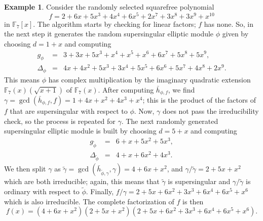 \documentclass[12pt]{article}
\theoremstyle{definition}
\newtheorem*{example*}{Example}
\def\F{\ensuremath{\mathbb{F}}}
\begin{document}
\begin{example*}
Consider the randomly selected squarefree polynomial 
\[ f = 2 + 6x + 5x^3 + 4x^4 + 6x^5 + 2x^7 + 3x^8 + 3x^9 + x^{10} \]
in $\F_7[x]$. The algorithm starts by checking for linear factors; $f$ has none. So, in the 
next step it generates the random supersingular elliptic module $\phi$ given by
choosing $d=1+x$ and computing
\[
\begin{array}{rll}
	g_\phi & = & 3 + 3x + 5x^3 + x^4 + x^5 + x^6 + 6x^7 + 5x^8 + 5x^9,\\
        \Delta_\phi&=&4x+4x^2+5x^3+3x^4+5x^5+6x^6+5x^7+4x^8+2x^9.
\end{array}
\]
This means $\phi$ has complex multiplication by the imaginary
quadratic extension $\F_7(x)(\sqrt{x + 1})$ of $\F_7(x)$. After
computing $\bar h_{\phi, f}$, we
find $\gamma = \gcd(\bar h_{\phi, f}, f) = 1 + 4x + x^2 + 4x^3 + x^4$; this is
the product of the factors of $f$ that are supersingular with respect
to $\phi$. Now, $\gamma$ does not pass the irreducibility check, so the
process is repeated for $\gamma$. The next randomly generated supersingular
elliptic module is built by choosing $d=5+x$ and computing
\[
\begin{array}{rll}
	g_{\tilde\phi} & = & 6 + x + 5x^2 + 5x^3,\\
	\Delta_{\tilde \phi} & = & 4+x + 6x^2 + 4x^3.
\end{array}
\]
We then split $\gamma$ as $ \tilde \gamma = \gcd(\bar h_{\tilde \phi,
  \gamma}, \gamma) = 4 + 6x + x^2$, and $\gamma/\tilde \gamma = 2 + 5x
+ x^2$ which are both irreducible; again, this means that $\tilde \gamma$
is supersingular and $\gamma/\tilde \gamma$ is ordinary with respect to $\tilde
\phi$. Finally, $f / \gamma = 2 + 5x + 6x^2 + 3x^3 + 6x^4 + 6x^5 + x^6$
which is also irreducible. The complete factorization of $f$ is
then \[ f(x) = (4 + 6x + x^2)(2 + 5x + x^2)(2 + 5x + 6x^2 + 3x^3 +
6x^4 + 6x^5 + x^6).\]
\end{example*}



\end{document}
